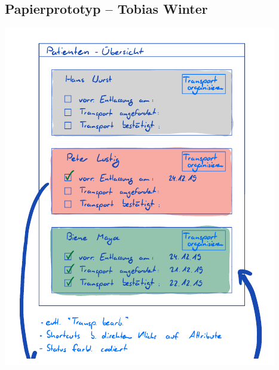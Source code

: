 \documentclass[a4paper, ngerman, 12pt]{scrartcl}
\begin{document}
\subsection{Papierprototyp – Tobias Winter}
\begin{center}
\begin{minipage}[b]{0.48\textwidth}
	\centering
	\includegraphics[width=\textwidth]{Bilder/PrototypTobias1.png}
	\label{img:winter1}
\end{minipage}
\begin{minipage}[b]{0.48\textwidth}
	\centering

\end{minipage}
\end{center}
\end{document}
